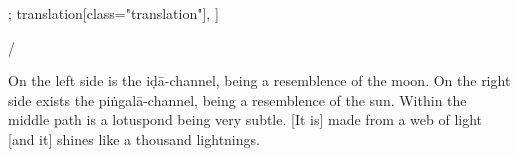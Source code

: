\documentclass[12pt]{article}%
\def\om{\textrm{\footnotesize \textit{omitted in}\ }} %
\begin{document}
\begin{alignment}[
    texts=edition[class="edition"];
    translation[class="translation"],
  ]
\begin{edition}
\begin{prose}
{          }/
      \end{prose}
    \end{edition}
    \begin{translation}
      \begin{tlate}On the left side is the iḍā-channel, being a resemblence of the moon. On the right side exists the piṅgalā-channel, being a resemblence of the sun. Within the middle path is a lotuspond being very subtle. [It is] made from a web of light [and it] shines like a thousand lightnings. \end{tlate}
    \end{translation}
    \begin{edition}
      \begin{prose}
\end{prose}
\end{edition}
\end{alignment}
\end{document}
